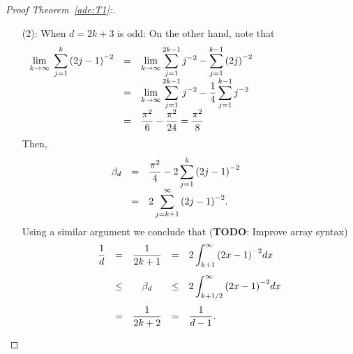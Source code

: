 \begin{proof}[Proof Theorem~\ref{ade:T1}:]
\begin{enumerate}
    \item[(2):] When $d = 2k+3$ is odd:
    On the other hand, note that
    \[\hspace{-35mm}\everymath{\displaystyle} 
      \begin{array}{rcl}
      \lim_{k\to\infty} \; \sum_{j = 1}^{k} {(2j-1)}^{-2} 
      & = & \lim_{k\to\infty} \sum_{j = 1}^{2k-1} j^{-2} - \sum_{j = 1}^{k-1} {(2j)}^{-2}\\
      & = & \lim_{k\to\infty} \sum_{j = 1}^{2k-1} j^{-2} - \frac{1}{4}\sum_{j = 1}^{k-1} j^{-2}\\
      & = & \frac{\pi^2}{6}-\frac{\pi^2}{24} = \frac{\pi^2}{8}
    \end{array}\]
    Then,
    \[\hspace{-10mm}\everymath{\displaystyle}
    \begin{array}{rll}
      \beta_d & = & \frac{\pi^2}{4} - 2 \sum_{j = 1}^{k} {\left(2j-1\right)}^{-2}\\
      & = & 2\sum_{j = k+1}^{\infty}{\left(2j-1\right)}^{-2}.\\
    \end{array}      
   \]
   Using a similar argument we conclude that (\textbf{TODO}: Improve array syntax)
   \[\everymath{\displaystyle} 
      \begin{array}{rrcrl}
        \frac{1}{d} & = & \frac{1}{2k+1}  & = & 2 \int_{k+1}^{\infty}{(2x-1)}^{-2} dx\\[5mm]
      & \leq & \beta_d    & \leq & 2 \int_{k+1/2}^{\infty}{(2x-1)}^{-2} dx\\[5mm]
      &  = & \frac{1}{2k+2} & = & \frac{1}{d-1}.
    \end{array}  \] 
  \end{enumerate}
\end{proof}

